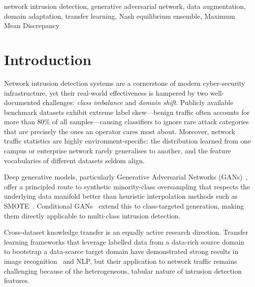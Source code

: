 \documentclass[conference]{IEEEtran}
\begin{document}
\begin{IEEEkeywords}
network intrusion detection, generative adversarial network, data augmentation,
domain adaptation, transfer learning, Nash equilibrium ensemble,
Maximum Mean Discrepancy
\end{IEEEkeywords}

\section{Introduction}

Network intrusion detection systems are a cornerstone of modern cyber-security
infrastructure, yet their real-world effectiveness is hampered by two
well-documented challenges: \emph{class imbalance} and \emph{domain shift}.
Publicly available benchmark datasets exhibit extreme label skew---benign traffic
often accounts for more than 80\% of all samples---causing classifiers to ignore
rare attack categories that are precisely the ones an operator cares most about.
Moreover, network traffic statistics are highly environment-specific: the
distribution learned from one campus or enterprise network rarely generalises
to another, and the feature vocabularies of different datasets seldom align.

Deep generative models, particularly Generative Adversarial Networks
(GANs)~\cite{goodfellow2014generative}, offer a principled route to synthetic
minority-class oversampling that respects the underlying data manifold better
than heuristic interpolation methods such as SMOTE~\cite{chawla2002smote}.
Conditional GANs~\cite{mirza2014conditional} extend this to class-targeted
generation, making them directly applicable to multi-class intrusion detection.

Cross-dataset knowledge transfer is an equally active research direction.
Transfer learning frameworks that leverage labelled data from a data-rich
source domain to bootstrap a data-scarce target domain have demonstrated
strong results in image recognition~\cite{pan2010survey} and NLP, but
their application to network traffic remains challenging because of the
heterogeneous, tabular nature of intrusion detection features.
\end{document}
